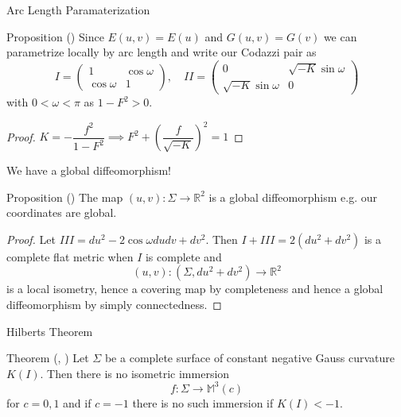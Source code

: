 \begin{frame}[c]{Arc Length Paramaterization}
	\begin{kulblock}{Proposition (\cite{firstarticle})}
		Since $E(u,v) = E(u)$ and $G(u,v) = G(v)$ we can parametrize locally by arc length and write our Codazzi pair as
		$$I = \begin{pmatrix}
				1           & \cos \omega \\
				\cos \omega & 1
			\end{pmatrix}, \quad II = \begin{pmatrix}
				0                     & \sqrt{-K}\sin \omega \\
				\sqrt{-K} \sin \omega & 0
			\end{pmatrix}$$
		with $0<\omega < \pi$ as $1-F^2 >0$.
	\end{kulblock}
	\begin{proof}
		$K = -\dfrac{f^2}{1-F^2} \implies F^2 + \left(\dfrac{f}{\sqrt{-K}}\right)^2 = 1$
	\end{proof}
\end{frame}

\begin{frame}[c]{We have a global diffeomorphism!}
	\begin{kulblock}{Proposition (\cite{firstarticle})}
		The map $ (u,v) : \Sigma \to \mathbb{R}^2$ is a global diffeomorphism e.g. our coordinates are global.
	\end{kulblock}
	\begin{proof}
		Let $III = du^2 - 2 \cos \omega dudv + dv^2$. Then $I + III = 2(du^2+dv^2)$ is a complete flat metric when $I$ is complete and
		$$ (u,v) : (\Sigma, du^2 + dv^2) \to \mathbb{R}^2$$
		is a local isometry, hence a covering map by completeness and hence a global diffeomorphism by simply connectedness.
	\end{proof}
\end{frame}

\begin{frame}[c]{Hilberts Theorem}
	\begin{kulblock}{Theorem (\cite{Hilbert}, \cite{firstarticle})}
		Let $\Sigma$ be a complete surface of constant negative Gauss curvature $K(I)$. Then there is no isometric immersion
		$$ f : \Sigma \to \mathbb{M}^3(c)$$
		for $c=0,1$ and if $c = -1$ there is no such immersion if $K(I) < -1$.
	\end{kulblock}
\end{frame}

